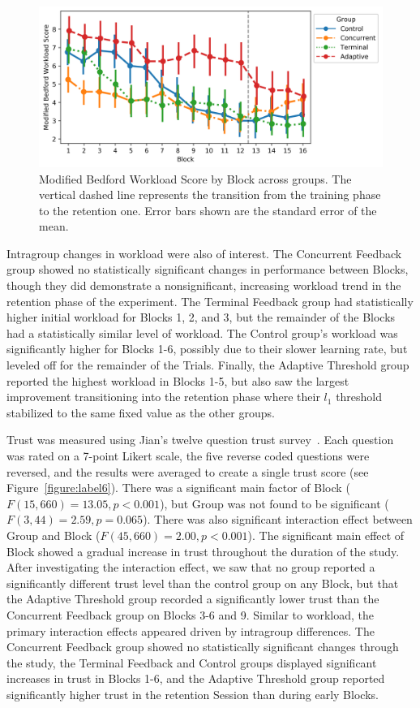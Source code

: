 \begin{figure}[hbt!]
	\centering
	\includegraphics[height=.4\textwidth]{figures/EMG/ModifiedBedfordWorkloadScore}
	\caption[Modified Bedford Workload Score by Block across groups]{Modified Bedford Workload Score by Block across groups.
		The vertical dashed line represents the transition from the training phase to the retention one.
		Error bars shown are the standard error of the mean.}
	\label{figure:label5}
\end{figure}

Intragroup changes in workload were also of interest.
The Concurrent Feedback group showed no statistically significant changes in performance between Blocks, though they did demonstrate a nonsignificant, increasing workload trend in the retention phase of the experiment.
The Terminal Feedback group had statistically higher initial workload for Blocks 1, 2, and 3, but the remainder of the Blocks had a statistically similar level of workload.
The Control group's workload was significantly higher for Blocks 1-6, possibly due to their slower learning rate, but leveled off for the remainder of the Trials.
Finally, the Adaptive Threshold group reported the highest workload in Blocks 1-5, but also saw the largest improvement transitioning into the retention phase where their $l_1$ threshold stabilized to the same fixed value as the other groups.

Trust was measured using Jian's twelve question trust survey~\citep{jian_foundations_2000}.
Each question was rated on a 7-point Likert scale, the five reverse coded questions were reversed, and the results were averaged to create a single trust score (see Figure~\ref{figure:label6}).
There was a significant main factor of Block ($F(15, 660) = 13.05, p < 0.001$), but Group was not found to be significant ($F(3, 44) = 2.59, p = 0.065$).
There was also significant interaction effect between Group and Block ($F(45, 660) = 2.00, p < 0.001$).
The significant main effect of Block showed a gradual increase in trust throughout the duration of the study.
After investigating the interaction effect, we saw that no group reported a significantly different trust level than the control group on any Block, but that the Adaptive Threshold group recorded a significantly lower trust than the Concurrent Feedback group on Blocks 3-6 and 9.
Similar to workload, the primary interaction effects appeared driven by intragroup differences.
The Concurrent Feedback group showed no statistically significant changes through the study, the Terminal Feedback and Control groups displayed significant increases in trust in Blocks 1-6, and the Adaptive Threshold group reported significantly higher trust in the retention Session than during early Blocks.

